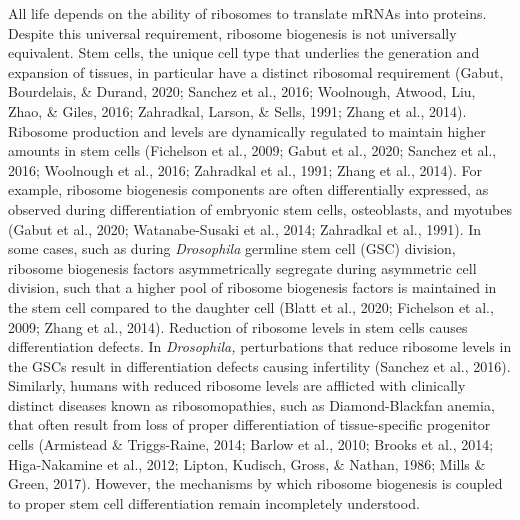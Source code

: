 \documentclass[12pt,twoside]{reedthesis}
\begin{document}
All life depends on the ability of ribosomes to translate mRNAs into
proteins. Despite this universal requirement, ribosome biogenesis is not
universally equivalent. Stem cells, the unique cell type that underlies
the generation and expansion of tissues, in particular have a distinct
ribosomal requirement (Gabut, Bourdelais, \& Durand, 2020; Sanchez et al., 2016; Woolnough, Atwood, Liu, Zhao, \& Giles, 2016; Zahradkal, Larson, \& Sells, 1991; Zhang et al., 2014). Ribosome
production and levels are dynamically regulated to maintain higher
amounts in stem cells (Fichelson et al., 2009; Gabut et al., 2020; Sanchez et al., 2016; Woolnough et al., 2016; Zahradkal et al., 1991; Zhang et al., 2014). For
example, ribosome biogenesis components are often differentially
expressed, as observed during differentiation of embryonic stem cells,
osteoblasts, and myotubes (Gabut et al., 2020; Watanabe-Susaki et al., 2014; Zahradkal et al., 1991). In
some cases, such as during \emph{Drosophila} germline stem cell (GSC)
division, ribosome biogenesis factors asymmetrically segregate during
asymmetric cell division, such that a higher pool of ribosome biogenesis
factors is maintained in the stem cell compared to the daughter cell
(Blatt et al., 2020; Fichelson et al., 2009; Zhang et al., 2014). Reduction of ribosome levels in stem cells causes
differentiation defects. In \emph{Drosophila,} perturbations that reduce
ribosome levels in the GSCs result in differentiation defects causing
infertility (Sanchez et al., 2016). Similarly, humans with reduced ribosome
levels are afflicted with clinically distinct diseases known as
ribosomopathies, such as Diamond-Blackfan anemia, that often result from
loss of proper differentiation of tissue-specific progenitor cells
(Armistead \& Triggs-Raine, 2014; Barlow et al., 2010; Brooks et al., 2014; Higa-Nakamine et al., 2012; Lipton, Kudisch, Gross, \& Nathan, 1986; Mills \& Green, 2017). However, the
mechanisms by which ribosome biogenesis is coupled to proper stem cell
differentiation remain incompletely understood.
\end{document}
